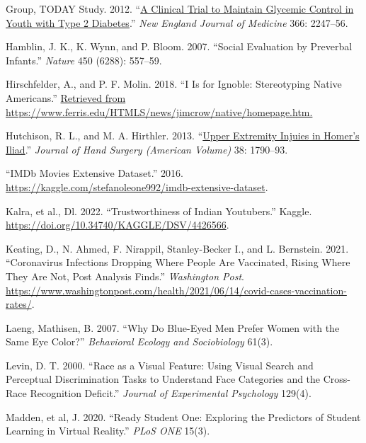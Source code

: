 \documentclass[
]{report}
\newlength{\cslhangindent}
\newenvironment{CSLReferences}[2] %
 {\begin{list}{}{%
  \setlength{\itemindent}{0pt}
  \setlength{\leftmargin}{0pt}
  \setlength{\parsep}{0pt}
  \ifodd #1
   \setlength{\leftmargin}{\cslhangindent}
   \setlength{\itemindent}{-1\cslhangindent}
  \fi
  \setlength{\itemsep}{#2\baselineskip}}}
 {\end{list}}
\begin{document}
\begin{CSLReferences}{1}{0}
Group, TODAY Study. 2012. {``\href{https://www.ncbi.nlm.nih.gov/pubmed/22540912}{A Clinical Trial to Maintain Glycemic Control in Youth with Type 2 Diabetes}.''} \emph{New England Journal of Medicine} 366: 2247--56.

Hamblin, J. K., K. Wynn, and P. Bloom. 2007. {``Social Evaluation by Preverbal Infants.''} \emph{Nature} 450 (6288): 557--59.

Hirschfelder, A., and P. F. Molin. 2018. {``I Is for Ignoble: Stereotyping Native Americans.''} \href{Retrieved\%20from\%20https://www.ferris.edu/HTMLS/news/jimcrow/native/homepage.htm.}{Retrieved from https://www.ferris.edu/HTMLS/news/jimcrow/native/homepage.htm.}

Hutchison, R. L., and M. A. Hirthler. 2013. {``\href{https://www.ncbi.nlm.nih.gov/pubmed/23932117}{Upper Extremity Injuies in Homer's Iliad}.''} \emph{Journal of Hand Surgery (American Volume)} 38: 1790--93.

{``{IMDb} Movies Extensive Dataset.''} 2016. \url{https://kaggle.com/stefanoleone992/imdb-extensive-dataset}.

Kalra, et al., Dl. 2022. {``Trustworthiness of Indian Youtubers.''} Kaggle. \url{https://doi.org/10.34740/KAGGLE/DSV/4426566}.

Keating, D., N. Ahmed, F. Nirappil, Stanley-Becker I., and L. Bernstein. 2021. {``Coronavirus Infections Dropping Where People Are Vaccinated, Rising Where They Are Not, Post Analysis Finds.''} \emph{Washington Post}. \url{https://www.washingtonpost.com/health/2021/06/14/covid-cases-vaccination-rates/}.

Laeng, Mathisen, B. 2007. {``Why Do Blue-Eyed Men Prefer Women with the Same Eye Color?''} \emph{Behavioral Ecology and Sociobiology} 61(3).

Levin, D. T. 2000. {``Race as a Visual Feature: Using Visual Search and Perceptual Discrimination Tasks to Understand Face Categories and the Cross-Race Recognition Deficit.''} \emph{Journal of Experimental Psychology} 129(4).

Madden, et al, J. 2020. {``Ready Student One: Exploring the Predictors of Student Learning in Virtual Reality.''} \emph{PLoS ONE} 15(3).


\end{CSLReferences}
\end{document}
